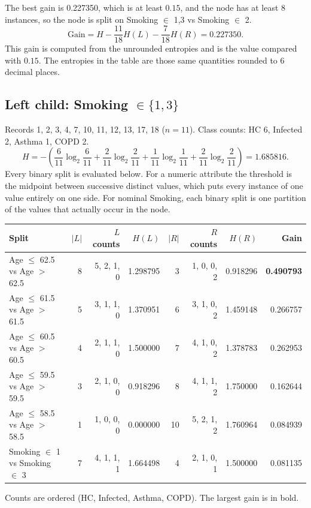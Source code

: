 The best gain is 0.227350, which is at least $0.15$, and the node has at least 8 instances, so the node is split on Smoking $\in$ {1,3} vs Smoking $\in$ {2}.
\[ \mathrm{Gain} = H - \frac{11}{18}H(L) - \frac{7}{18}H(R) = 0.227350. \]
This gain is computed from the unrounded entropies and is the value compared with $0.15$. The entropies in the table are those same quantities rounded to 6 decimal places.

\subsection*{Left child: Smoking $\in \{1,3\}$}

Records 1, 2, 3, 4, 7, 10, 11, 12, 13, 17, 18 ($n=11$). Class counts: HC 6, Infected 2, Asthma 1, COPD 2.
\[ H = -\left(\frac{6}{11}\log_2\frac{6}{11}+\frac{2}{11}\log_2\frac{2}{11}+\frac{1}{11}\log_2\frac{1}{11}+\frac{2}{11}\log_2\frac{2}{11}\right) = 1.685816. \]
Every binary split is evaluated below. For a numeric attribute the threshold is the midpoint between successive distinct values, which puts every instance of one value entirely on one side. For nominal Smoking, each binary split is one partition of the values that actually occur in the node.

\begin{center}
\scriptsize
\begin{tabular}{lrrrrrrr}
\toprule
Split & $|L|$ & $L$ counts & $H(L)$ & $|R|$ & $R$ counts & $H(R)$ & Gain \\
\midrule
Age $\le$ 62.5 vs Age $>$ 62.5 & 8 & 5, 2, 1, 0 & 1.298795 & 3 & 1, 0, 0, 2 & 0.918296 &  \textbf{0.490793} \\
Age $\le$ 61.5 vs Age $>$ 61.5 & 5 & 3, 1, 1, 0 & 1.370951 & 6 & 3, 1, 0, 2 & 1.459148 & 0.266757 \\
Age $\le$ 60.5 vs Age $>$ 60.5 & 4 & 2, 1, 1, 0 & 1.500000 & 7 & 4, 1, 0, 2 & 1.378783 & 0.262953 \\
Age $\le$ 59.5 vs Age $>$ 59.5 & 3 & 2, 1, 0, 0 & 0.918296 & 8 & 4, 1, 1, 2 & 1.750000 & 0.162644 \\
Age $\le$ 58.5 vs Age $>$ 58.5 & 1 & 1, 0, 0, 0 & 0.000000 & 10 & 5, 2, 1, 2 & 1.760964 & 0.084939 \\
Smoking $\in$ {1} vs Smoking $\in$ {3} & 7 & 4, 1, 1, 1 & 1.664498 & 4 & 2, 1, 0, 1 & 1.500000 & 0.081135 \\
\bottomrule
\end{tabular}
\end{center}
Counts are ordered (HC, Infected, Asthma, COPD). The largest gain is in bold.

